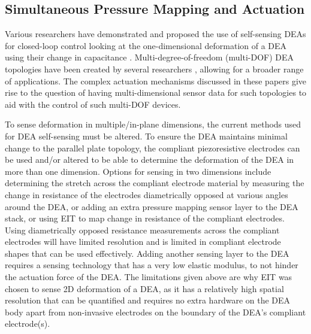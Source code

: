 

\subsection{Simultaneous Pressure Mapping and Actuation}
\label{subsec:sensing_and_actuation}
Various researchers have demonstrated and proposed the use of self-sensing DEAs for closed-loop control looking at the one-dimensional deformation of a DEA using their change in capacitance \cite{Gisby2013, Liu2016, Huang2023, Koshiya2023}. Multi-degree-of-freedom (multi-DOF) DEA topologies have been created by several researchers \cite{Nguyen2017, Zhang2024, Zou2023, Pei2004} , allowing for a broader range of applications. The complex actuation mechanisms discussed in these papers give rise to the question of having multi-dimensional sensor data for such topologies to aid with the control of such multi-DOF devices.

To sense deformation in multiple/in-plane dimensions, the current methods used for DEA self-sensing must be altered. To ensure the DEA maintains minimal change to the parallel plate topology, the compliant piezoresistive electrodes can be used and/or altered to be able to determine the deformation of the DEA in more than one dimension. Options for sensing in two dimensions include determining the stretch across the compliant electrode material by measuring the change in resistance of the electrodes diametrically opposed at various angles around the DEA, or adding an extra pressure mapping sensor layer to the DEA stack, or using EIT to map change in resistance of the compliant electrodes. Using diametrically opposed resistance measurements across the compliant electrodes will have limited resolution and is limited in compliant electrode shapes that can be used effectively. Adding another sensing layer to the DEA requires a sensing technology that has a very low elastic modulus, to not hinder the actuation force of the DEA. The limitations given above are why EIT was chosen to sense 2D deformation of a DEA, as it has a relatively high spatial resolution that can be quantified and requires no extra hardware on the DEA body apart from non-invasive electrodes on the boundary of the DEA's compliant electrode(s).

